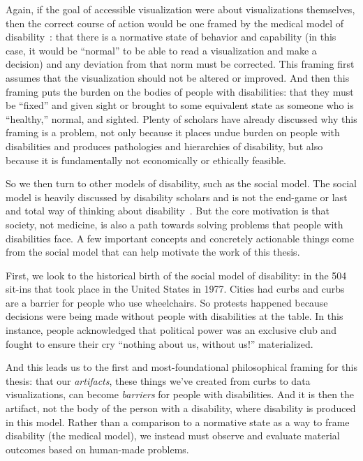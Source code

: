\documentclass[12pt]{cmuthesis}
\begin{document}
Again, if the goal of accessible visualization were about visualizations themselves, then the correct course of action would be one framed by the medical model of disability~\cite{Marks1997}: that there is a normative state of behavior and capability (in this case, it would be ``normal'' to be able to read a visualization and make a decision) and any deviation from that norm must be corrected. This framing first assumes that the visualization should not be altered or improved. And then this framing puts the burden on the bodies of people with disabilities: that they must be ``fixed'' and given sight or brought to some equivalent state as someone who is ``healthy,'' normal, and sighted.  Plenty of scholars have already discussed why this framing is a problem, not only because it places undue burden on people with disabilities and produces pathologies and hierarchies of disability, but also because it is fundamentally not economically or ethically feasible.

So we then turn to other models of disability, such as the social model. The social model is heavily discussed by disability scholars and is not the end-game or last and total way of thinking about disability~\cite{Marks1997, Yeo2003, Reid2022Curb, Roscoe2019, Spiel2020}. But the core motivation is that society, not medicine, is also a path towards solving problems that people with disabilities face. A few important concepts and concretely actionable things come from the social model that can help motivate the work of this thesis.

First, we look to the historical birth of the social model of disability: in the 504 sit-ins that took place in the United States in 1977. Cities had curbs and curbs are a barrier for people who use wheelchairs. So protests happened because decisions were being made without people with disabilities at the table. In this instance, people acknowledged that political power was an exclusive club and fought to ensure their cry ``nothing about us, without us!'' materialized.

And this leads us to the first and most-foundational philosophical framing for this thesis: that our \textit{artifacts}, these things we've created from curbs to data visualizations, can become \textit{barriers} for people with disabilities. And it is then the artifact, not the body of the person with a disability, where disability is produced in this model. Rather than a comparison to a normative state as a way to frame disability (the medical model), we instead must observe and evaluate material outcomes based on human-made problems.
\end{document}
